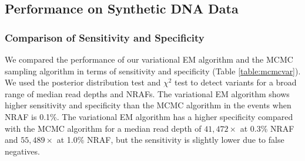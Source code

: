 \documentclass{bmcart}
\begin{document}
\subsection*{Performance on Synthetic DNA Data}

\subsubsection*{Comparison of Sensitivity and Specificity}

We compared the performance of our variational EM algorithm and the MCMC sampling algorithm in terms of sensitivity and specificity (Table \ref{table:mcmcvar}).
We used the posterior distribution test and $\chi^2$ test to detect variants for a broad range of median read depths and NRAFs.
The variational EM algorithm shows higher sensitivity and specificity than the MCMC algorithm in the events when NRAF is 0.1\%.
The variational EM algorithm has a higher specificity compared with the MCMC algorithm for a median read depth of $41,472\times$ at 0.3\% NRAF and $55,489\times$ at 1.0\% NRAF, but the sensitivity is slightly lower due to false negatives.
%
\end{document}
